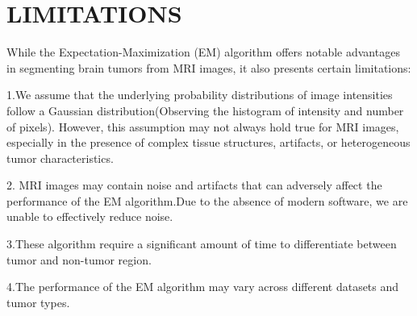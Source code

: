 \section{LIMITATIONS}
While the Expectation-Maximization (EM) algorithm offers notable advantages in segmenting brain tumors from MRI images, it also presents certain limitations:

1.We assume that the underlying probability distributions of image intensities follow a Gaussian distribution(Observing the histogram of intensity and number of pixels). However, this assumption may not always hold true for MRI images, especially in the presence of complex tissue structures, artifacts, or heterogeneous tumor characteristics.

2. MRI images may contain noise and artifacts that can adversely affect the performance of the EM algorithm.Due to the absence of modern software, we are unable to effectively reduce noise.

3.These algorithm require a significant amount of time to differentiate between tumor and non-tumor region.

4.The performance of the EM algorithm may vary across different datasets and tumor types.



